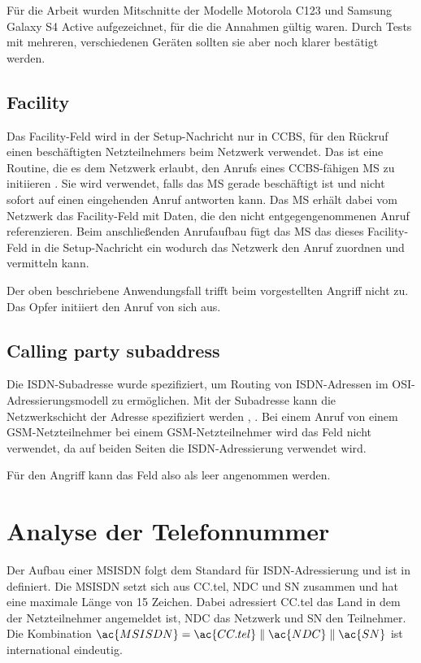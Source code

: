 Für die Arbeit wurden Mitschnitte der Modelle Motorola C123 und Samsung Galaxy S4 Active aufgezeichnet, für die die Annahmen gültig waren. Durch Tests mit mehreren, verschiedenen Geräten sollten sie aber noch klarer bestätigt werden.

\subsection*{Facility}

Das Facility-Feld wird in der Setup-Nachricht nur in \ac{CCBS}, für den Rückruf einen beschäftigten Netzteilnehmers beim Netzwerk verwendet. Das ist eine Routine, die es dem Netzwerk erlaubt, den Anrufs eines \ac{CCBS}-fähigen \ac{MS} zu initiieren \citep[Kap. 5.2.3]{3gpp:24.008}. Sie wird verwendet, falls das \ac{MS} gerade beschäftigt ist und nicht sofort auf einen eingehenden Anruf antworten kann. Das \ac{MS} erhält dabei vom Netzwerk das Facility-Feld mit Daten, die den nicht entgegengenommenen Anruf referenzieren. Beim anschließenden Anrufaufbau fügt das \ac{MS} das dieses Facility-Feld in die Setup-Nachricht ein \citep[Kap. 5.2.3.2.1]{3gpp:24.008} wodurch das Netzwerk den Anruf zuordnen und vermitteln kann. 

Der oben beschriebene Anwendungsfall trifft beim vorgestellten Angriff nicht zu. Das Opfer initiiert den Anruf von sich aus.

\subsection*{Calling party subaddress}

Die \ac{ISDN}-Subadresse wurde spezifiziert, um Routing von \ac{ISDN}-Adressen im \ac{OSI}-Adressierungsmodell zu ermöglichen. Mit der Subadresse kann die Netzwerkschicht der Adresse spezifiziert werden , . Bei einem Anruf von einem \ac{GSM}-Netzteilnehmer bei einem \ac{GSM}-Netzteilnehmer wird das Feld nicht verwendet, da auf beiden Seiten die \ac{ISDN}-Adressierung verwendet wird.

Für den Angriff kann das Feld also als leer angenommen werden.

\section{Analyse der Telefonnummer} \label{hdl:analysis-tel}

Der Aufbau einer \ac{MSISDN} folgt dem  Standard für \ac{ISDN}-Adressierung und ist in  definiert. Die \ac{MSISDN} setzt sich aus \ac{CC.tel}, \ac{NDC} und \ac{SN} zusammen und hat eine maximale Länge von 15 Zeichen. Dabei adressiert \ac{CC.tel} das Land in dem der Netzteilnehmer angemeldet ist, \ac{NDC} das Netzwerk und \ac{SN} den Teilnehmer. Die Kombination $\ac{MSISDN} = \ac{CC.tel} \parallel \ac{NDC} \parallel \ac{SN}$ ist international eindeutig.

